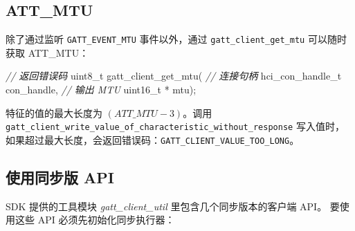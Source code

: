 \documentclass[
  12pt,
]{book}
\newenvironment{Shaded}{\begin{snugshade}}{\end{snugshade}}
\newcommand{\CommentTok}[1]{\textcolor[rgb]{0.56,0.35,0.01}{\textit{#1}}}
\newcommand{\DataTypeTok}[1]{\textcolor[rgb]{0.13,0.29,0.53}{#1}}
\newcommand{\NormalTok}[1]{#1}
\begin{document}
\hypertarget{att_mtu-1}{%
\subsection{ATT\_MTU}\label{att_mtu-1}}

除了通过监听 \texttt{GATT\_EVENT\_MTU} 事件以外，通过 \texttt{gatt\_client\_get\_mtu} 可以随时获取 ATT\_MTU：

\begin{Shaded}
\begin{Highlighting}[]
\CommentTok{// 返回错误码}
\DataTypeTok{uint8_t}\NormalTok{ gatt_client_get_mtu(}
    \CommentTok{// 连接句柄}
\NormalTok{    hci_con_handle_t con_handle,}
    \CommentTok{// 输出 MTU}
    \DataTypeTok{uint16_t}\NormalTok{ * mtu);}
\end{Highlighting}
\end{Shaded}

特征的值的最大长度为 \((ATT\_MTU - 3)\)。调用 \texttt{gatt\_client\_write\_value\_of\_characteristic\_without\_response} 写入值时，
如果超过最大长度，会返回错误码：\texttt{GATT\_CLIENT\_VALUE\_TOO\_LONG}。

\hypertarget{gatt-client-synced-api}{%
\subsection{使用同步版 API}\label{gatt-client-synced-api}}

SDK 提供的工具模块 \emph{gatt\_client\_util} 里包含几个同步版本的客户端 API。
要使用这些 API 必须先初始化同步执行器：
\end{document}

